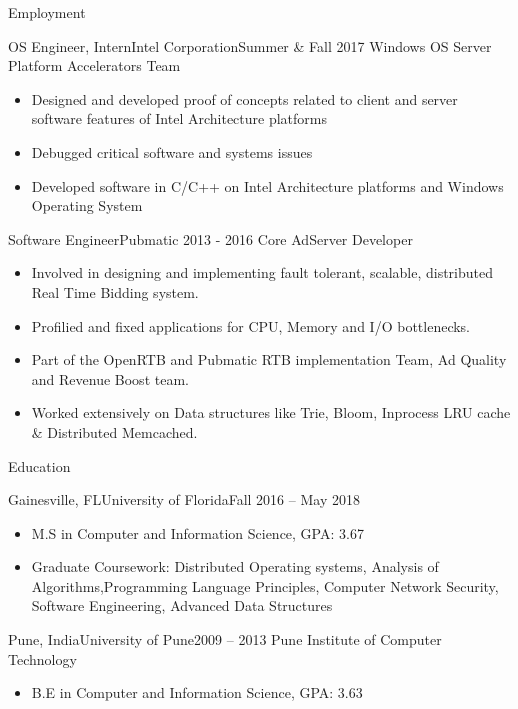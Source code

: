 \documentclass[]{mcdowellcv}
\begin{document}
	\makeheader
	
	\begin{cvsection}{Employment}
		\begin{cvsubsection}{OS Engineer, Intern}{Intel Corporation}{Summer \& Fall 2017}
			Windows OS Server Platform Accelerators Team			
			\begin{itemize}
			\item Designed and developed proof of concepts related to client and server software features of Intel Architecture platforms 
			\item Debugged critical software and systems issues 
			\item Developed software in C/C++ on Intel Architecture platforms and Windows Operating System 
		\end{itemize}
		\end{cvsubsection}
		
		\begin{cvsubsection}{Software Engineer}{Pubmatic }{2013 - 2016}	
			Core AdServer Developer
			\begin{itemize}
			\item Involved in designing and implementing fault tolerant, scalable, distributed Real Time Bidding system.
			\item  Profilied and fixed applications for CPU, Memory and I/O bottlenecks.
			\item Part of the OpenRTB and Pubmatic RTB implementation Team, Ad Quality and Revenue Boost team.
			\item Worked extensively on Data structures like Trie, Bloom, Inprocess LRU cache \& Distributed Memcached.
			\end{itemize}
		\end{cvsubsection}
		
		\end{cvsection}
	
	\begin{cvsection}{Education}
		\begin{cvsubsection}{Gainesville, FL}{University of Florida}{Fall 2016 -- May 2018}
			\begin{itemize}
				\item M.S in Computer and Information Science,  GPA: 3.67
				\item  Graduate Coursework: Distributed Operating systems, Analysis of Algorithms,Programming Language Principles, Computer Network
			Security, Software Engineering, Advanced Data Structures
			
		\end{itemize}
		\end{cvsubsection}
		\begin{cvsubsection}{Pune, India}{University of Pune}{2009 -- 2013}
			Pune Institute of Computer Technology	
		\begin{itemize}
				\item B.E in Computer and Information Science,  GPA: 3.63
		\end{itemize}
		\end{cvsubsection}

	\end{cvsection}
	
\end{document}
